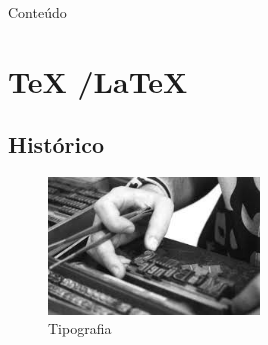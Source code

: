 






% 


\begin {frame}{Conteúdo}
\small
    \begin{multicols}{3}
        \tableofcontents
    \end{multicols}
\end {frame}

\section {\TeX{} /\LaTeX{}}
\subsection*{Histórico}
\begin{frame}
\begin{figure}[htbp]
    \centering
        \includegraphics[width=0.5\textwidth]{figuras/tipografia.jpeg}
    \caption{Tipografia}
    \label{fig:tipografia}
\end{figure}
\end{frame}

